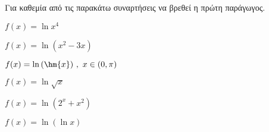 Για καθεμία από τις παρακάτω συναρτήσεις να βρεθεί η πρώτη παράγωγος.
\begin{multicols}{2}
\begin{alist}
\item $ f(x)=\ln{x^4} $
\item $ f(x)=\ln{(x^2-3x)} $
\item $ f(x)=\ln{(\hm{x})}\ ,\ x\in(0,\pi) $
\item $ f(x)=\ln{\sqrt{x}} $
\item $ f(x)=\ln{(2^x+x^2)} $
\item $ f(x)=\ln{(\ln{x})} $
\end{alist}
\end{multicols}
